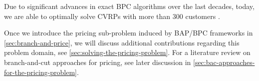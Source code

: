 Due to significant advances in exact BPC algorithms over the last decades,
today,
we are able to optimally solve CVRPs with more than $300$ customers \parencite{costa2019}.

\medskip

Once we introduce the pricing sub-problem induced by BAP/BPC frameworks
in \cref{sec:branch-and-price},
we will discuss additional contributions regarding this problem domain,
see \cref{sec:solving-the-pricing-problem}.
For a literature review on branch-and-cut approaches for pricing, see later discussion
in \cref{sec:bac-approaches-for-the-pricing-problem}.
